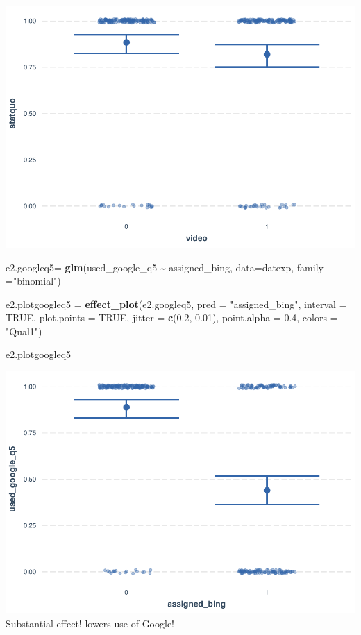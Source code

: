 \documentclass[
  11pt,
]{article}
\newenvironment{Shaded}{\begin{snugshade}}{\end{snugshade}}
\newcommand{\AttributeTok}[1]{\textcolor[rgb]{0.13,0.29,0.53}{#1}}
\newcommand{\ConstantTok}[1]{\textcolor[rgb]{0.56,0.35,0.01}{#1}}
\newcommand{\FloatTok}[1]{\textcolor[rgb]{0.00,0.00,0.81}{#1}}
\newcommand{\FunctionTok}[1]{\textcolor[rgb]{0.13,0.29,0.53}{\textbf{#1}}}
\newcommand{\NormalTok}[1]{#1}
\newcommand{\OtherTok}[1]{\textcolor[rgb]{0.56,0.35,0.01}{#1}}
\newcommand{\SpecialCharTok}[1]{\textcolor[rgb]{0.81,0.36,0.00}{\textbf{#1}}}
\newcommand{\StringTok}[1]{\textcolor[rgb]{0.31,0.60,0.02}{#1}}
\begin{document}
\includegraphics{analysis-July19_files/figure-latex/unnamed-chunk-18-1.pdf}

\begin{Shaded}
\begin{Highlighting}[]
\NormalTok{e2.googleq5}\OtherTok{=} \FunctionTok{glm}\NormalTok{(used\_google\_q5 }\SpecialCharTok{\textasciitilde{}}\NormalTok{ assigned\_bing, }\AttributeTok{data=}\NormalTok{datexp, }\AttributeTok{family =}\StringTok{"binomial"}\NormalTok{)}

\NormalTok{e2.plotgoogleq5 }\OtherTok{=} \FunctionTok{effect\_plot}\NormalTok{(e2.googleq5, }\AttributeTok{pred =} \StringTok{"assigned\_bing"}\NormalTok{, }\AttributeTok{interval =} \ConstantTok{TRUE}\NormalTok{, }\AttributeTok{plot.points =} \ConstantTok{TRUE}\NormalTok{, }\AttributeTok{jitter =} \FunctionTok{c}\NormalTok{(}\FloatTok{0.2}\NormalTok{, }\FloatTok{0.01}\NormalTok{), }\AttributeTok{point.alpha =} \FloatTok{0.4}\NormalTok{, }\AttributeTok{colors =} \StringTok{"Qual1"}\NormalTok{)}

\NormalTok{e2.plotgoogleq5}
\end{Highlighting}
\end{Shaded}

\includegraphics{analysis-July19_files/figure-latex/unnamed-chunk-19-1.pdf}
Substantial effect! lowers use of Google!
\end{document}
